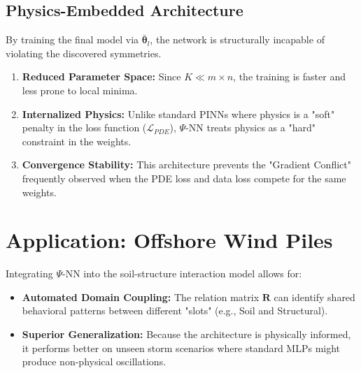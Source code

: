 \documentclass[11pt,a4paper]{article}
\newcommand{\PsiNN}{$\Psi$-NN}
\begin{document}
\subsection{Physics-Embedded Architecture}
By training the final model via $\bar{\mathbf{\theta}}_l$, the network is structurally incapable of violating the discovered symmetries.
\begin{enumerate}
    \item \textbf{Reduced Parameter Space:} Since $K \ll m \times n$, the training is faster and less prone to local minima.
    \item \textbf{Internalized Physics:} Unlike standard PINNs where physics is a "soft" penalty in the loss function ($\mathcal{L}_{PDE}$), \PsiNN{} treats physics as a "hard" constraint in the weights.
    \item \textbf{Convergence Stability:} This architecture prevents the "Gradient Conflict" frequently observed when the PDE loss and data loss compete for the same weights.
\end{enumerate}

\section{Application: Offshore Wind Piles}
Integrating \PsiNN{} into the soil-structure interaction model allows for:
\begin{itemize}
    \item \textbf{Automated Domain Coupling:} The relation matrix $\mathbf{R}$ can identify shared behavioral patterns between different "slots" (e.g., Soil and Structural).
    \item \textbf{Superior Generalization:} Because the architecture is physically informed, it performs better on unseen storm scenarios where standard MLPs might produce non-physical oscillations.
\end{itemize}
\end{document}
